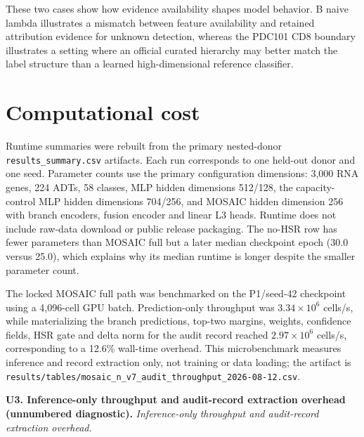\documentclass[10pt]{article}
\begin{document}
These two cases show how evidence availability shapes model behavior. B naive lambda illustrates a mismatch between feature availability and retained attribution evidence for unknown detection, whereas the PDC101 CD8 boundary illustrates a setting where an official curated hierarchy may better match the label structure than a learned high-dimensional reference classifier.

\section{Computational cost}

Runtime summaries were rebuilt from the primary nested-donor \texttt{results\_summary.csv} artifacts. Each run corresponds to one held-out donor and one seed. Parameter counts use the primary configuration dimensions: 3,000 RNA genes, 224 ADTs, 58 classes, MLP hidden dimensions 512/128, the capacity-control MLP hidden dimensions 704/256, and MOSAIC hidden dimension 256 with branch encoders, fusion encoder and linear L3 heads. Runtime does not include raw-data download or public release packaging.
The no-HSR row has fewer parameters than MOSAIC full but a later median checkpoint epoch (30.0 versus 25.0), which explains why its median runtime is longer despite the smaller parameter count.

\begin{table}[H]
\centering
\caption{Computational cost in the primary nested donor matrix. Runtime is wall-clock training time per fold--seed unit recorded in the run summaries.}
\label{tab:computational-cost}
\small
\resizebox{\textwidth}{!}{%

}
\end{table}

The locked MOSAIC full path was benchmarked on the P1/seed-42 checkpoint using a 4,096-cell GPU batch. Prediction-only throughput was $3.34\times10^6$ cells/s, while materializing the branch predictions, top-two margins, weights, confidence fields, HSR gate and delta norm for the audit record reached $2.97\times10^6$ cells/s, corresponding to a 12.6\% wall-time overhead. This microbenchmark measures inference and record extraction only, not training or data loading; the artifact is \texttt{results/tables/mosaic\_n\_v7\_audit\_throughput\_2026-08-12.csv}.

\begin{center}
\textbf{U3. Inference-only throughput and audit-record extraction overhead (unnumbered diagnostic).}
\textit{Inference-only throughput and audit-record extraction overhead.}
\scriptsize
\setlength{\tabcolsep}{3pt}

\end{center}
\end{document}
